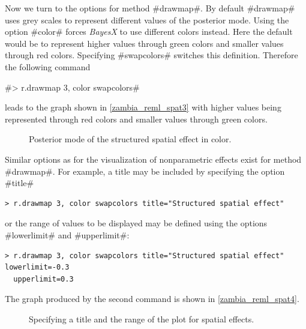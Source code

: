 \documentclass[11pt,a4paper,twoside]{bayesxreport}
\begin{document}
Now we turn to the options for method #drawmap#. By default
#drawmap# uses grey scales to represent different values of the
posterior mode. Using the option #color# forces {\it BayesX} to use
different colors instead. Here the default would be to represent
higher values through green colors and smaller values through red
colors. Specifying #swapcolors# switches this definition. Therefore
the following command

#> r.drawmap 3, color swapcolors#

leads to the graph shown in \autoref{zambia_reml_spat3} with higher
values being represented through red colors and smaller values
through green colors.

\begin{figure}[ht]
\begin{center}
{\it\caption{Posterior mode of the structured spatial effect in
color.\label{zambia_reml_spat3}}}
\end{center}
\end{figure}


Similar options as for the visualization of nonparametric effects
exist for method #drawmap#. For example, a title may be included by
specifying the option #title#

\begin{verbatim}
> r.drawmap 3, color swapcolors title="Structured spatial effect"
\end{verbatim}

or the range of values to be displayed may be defined using the
options #lowerlimit# and #upperlimit#:

\begin{verbatim}
> r.drawmap 3, color swapcolors title="Structured spatial effect" lowerlimit=-0.3
  upperlimit=0.3
\end{verbatim}

The graph produced by the second command is shown in
\autoref{zambia_reml_spat4}.

\begin{figure}[ht]
\begin{center}
{\it\caption{Specifying a title and the range of the plot for
spatial effects.\label{zambia_reml_spat4}}}
\end{center}
\end{figure}

%
\end{document}
